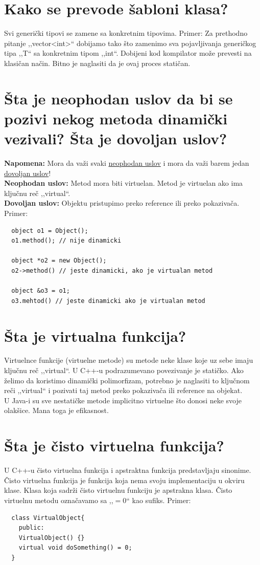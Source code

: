 \documentclass[a4paper]{article}
\begin{document}
\section{Kako se prevode šabloni klasa?}
  Svi generički tipovi se zamene sa konkretnim tipovima.
  Primer: Za prethodno pitanje ,,vector<int>`` dobijamo tako što zamenimo sva pojavljivanja generičkog 
  tipa ,,T`` sa konkretnim tipom ,,int``. Dobijeni kod kompilator može prevesti na klasičan način. 
  Bitno je naglasiti da je ovaj proces statičan.

\section{Šta je neophodan uslov da bi se pozivi nekog metoda dinamički vezivali? Šta je dovoljan uslov?}
  \textbf{Napomena:} Mora da važi svaki \underline{neophodan uslov} i 
  mora da važi barem jedan \underline{dovoljan uslov}!\\
  \textbf{Neophodan uslov:} Metod mora biti virtuelan. Metod je virtuelan ako ima ključnu reč ,,virtual``.\\
  \textbf{Dovoljan uslov:} Objektu pristupimo preko reference ili preko pokazivača.
  Primer:
  \begin{lstlisting}
  object o1 = Object();
  o1.method(); // nije dinamicki

  object *o2 = new Object();
  o2->method() // jeste dinamicki, ako je virtualan metod

  object &o3 = o1;
  o3.mehtod() // jeste dinamicki ako je virtualan metod\end{lstlisting}
\section{Šta je virtualna funkcija?}
  Virtuelnce funkcije (virtuelne metode) su metode neke klase koje uz sebe imaju ključnu reč ,,virtual``.
  U C++-u podrazumevano povezivanje je statičko. Ako želimo da koristimo dinamički polimorfizam, potrebno je
  naglasiti to ključnom reči ,,virtual`` i pozivati taj metod preko pokazivača ili reference na objekat.\\
  \indent U Java-i su sve nestatičke metode implicitno virtuelne što donosi neke svoje olakšice. Mana 
  toga je efikasnost.

\section{Šta je čisto virtuelna funkcija?}
  U C++-u čisto virtuelna funkcija i apstraktna funkcija predstavljaju sinonime. Čisto virtuelna funkcija
  je funkcija koja nema svoju implementaciju u okviru klase. Klasa koja sadrži čisto virtuelnu funkciju
  je apstrakna klasa. Čisto virtuelnu metodu označavamo sa ,,$= 0$`` kao sufiks.
  Primer:
  \begin{lstlisting}
  class VirtualObject{
    public:
    VirtualObject() {}
    virtual void doSomething() = 0;
  }\end{lstlisting}
\end{document}
